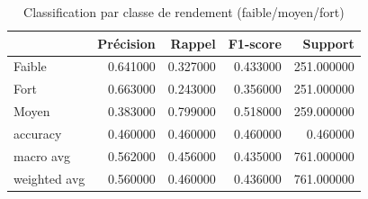 \begin{table}
\caption{Classification par classe de rendement (faible/moyen/fort)}
\label{tab:classification}
\begin{tabular}{lrrrr}
\toprule
 & Précision & Rappel & F1-score & Support \\
\midrule
Faible & 0.641000 & 0.327000 & 0.433000 & 251.000000 \\
Fort & 0.663000 & 0.243000 & 0.356000 & 251.000000 \\
Moyen & 0.383000 & 0.799000 & 0.518000 & 259.000000 \\
accuracy & 0.460000 & 0.460000 & 0.460000 & 0.460000 \\
macro avg & 0.562000 & 0.456000 & 0.435000 & 761.000000 \\
weighted avg & 0.560000 & 0.460000 & 0.436000 & 761.000000 \\
\bottomrule
\end{tabular}
\end{table}
